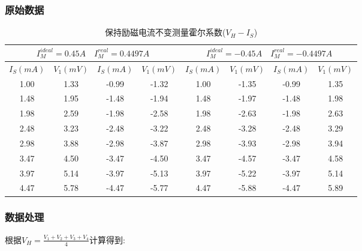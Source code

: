 \documentclass[a4paper]{article}
\begin{document}
    \subsubsection{原始数据}
    \begin{table}[h!]
        \centering
        \caption{保持励磁电流不变测量霍尔系数($V_H-I_S$)}
        \begin{tabular}{|c|c|c|c|c|c|c|c|}
            \hline
            \multicolumn{4}{|c|}{$I_M^{ideal}=0.45A\quad I_M^{real}=0.4497A$} & \multicolumn{4}{|c|}{$I_M^{ideal}=-0.45A \quad I_M^{real}=-0.4497A$} \\
            \hline
            $I_S(mA)$ & $V_1(mV)$ & $I_S(mA)$ & $V_1(mV)$ & $I_S(mA)$ & $V_1(mV)$ & $I_S(mA)$ & $V_1(mV)$ \\
            \hline
            1.00      & 1.33      & -0.99     & -1.32     & 1.00      & -1.35     & -0.99     & 1.35      \\
            \hline
            1.48      & 1.95      & -1.48     & -1.94     & 1.48      & -1.97     & -1.48     & 1.98      \\
            \hline
            1.98      & 2.59      & -1.98     & -2.58     & 1.98      & -2.63     & -1.98     & 2.63      \\
            \hline
            2.48      & 3.23      & -2.48     & -3.22     & 2.48      & -3.28     & -2.48     & 3.29      \\
            \hline
            2.98      & 3.88      & -2.98     & -3.87     & 2.98      & -3.93     & -2.98     & 3.94      \\
            \hline
            3.47      & 4.50      & -3.47     & -4.50     & 3.47      & -4.57     & -3.47     & 4.58      \\
            \hline
            3.97      & 5.14      & -3.97     & -5.13     & 3.97      & -5.22     & -3.97     & 5.14      \\
            \hline
            4.47      & 5.78      & -4.47     & -5.77     & 4.47      & -5.88     & -4.47     & 5.89      \\
            \hline
        \end{tabular}\label{tab:table}
    \end{table}

    \subsubsection{数据处理}

    {根据$V_H = \frac{V_1+V_2+V_3+V_4}{4}$计算得到:}
\end{document}
